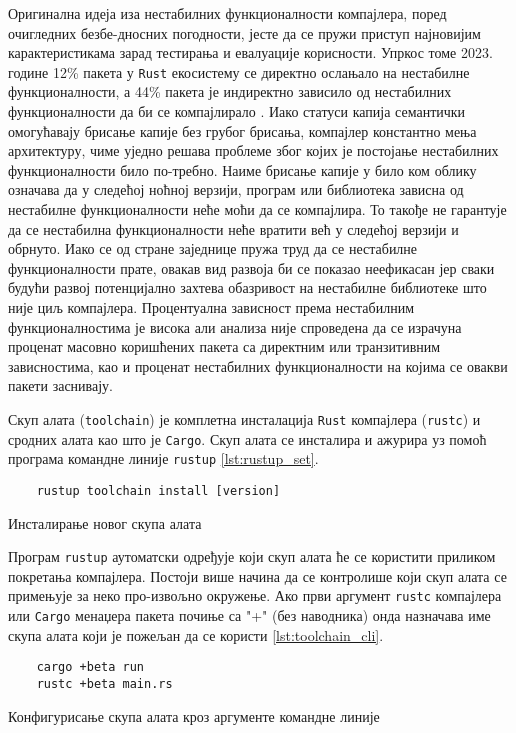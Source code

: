 Оригинална идеја иза нестабилних функционалности компајлера, поред очигледних безбе\hyp{}дносних погодности, 
јесте да се пружи приступ најновијим карактеристикама зарад тестирања и евалуације корисности.
Упркос томе 2023. године 12\%  пакета у \verb|Rust| екосистему се директно ослањало на нестабилне функционалности, а 
44\% пакета је индиректно зависило од нестабилних функционалности да би се компајлирало \cite{unstable-flags}. Иако 
статуси капија семантички омогућавају брисање капије без грубог брисања, компајлер константно мења архитектуру, чиме уједно 
решава проблеме због којих је постојање нестабилних функционалности било по\hyp{}требно. Наиме брисање капије 
у било ком облику означава да у следећој ноћној верзији, програм или библиотека зависна од нестабилне функционалности
неће моћи да се компајлира. То такође не гарантује да се нестабилна функционалности неће вратити већ у следећој
верзији и обрнуто. Иако се од стране заједнице пружа труд да се нестабилне функционалности прате, овакав вид 
развоја би се показао неефикасан јер сваки будући развој потенцијално захтева обазривост на нестабилне 
библиотеке што није циљ компајлера. Процентуална зависност према нестабилним функционалностима је висока али 
анализа није спроведена да се израчуна проценат масовно коришћених пакета са директним или транзитивним
зависностима, као и проценат нестабилних функционалности на којима се овакви пакети заснивају.

Скуп алата (\verb|toolchain|) је комплетна инсталација \verb|Rust| компајлера (\verb|rustc|) и сродних алата као што 
је \verb|Cargo|. Скуп алата се инсталира и ажурира уз помоћ програма командне линије \verb|rustup| \ref{lst:rustup_set}. 

\begin{listing}[H]
\begin{verbatim}
    rustup toolchain install [version]
\end{verbatim}
\caption{Инсталирање новог скупа алата}
\label{lst:rustup_set}
\end{listing}

Програм \verb|rustup| аутоматски одређује који скуп алата ће се користити приликом покретања компајлера. 
Постоји више начина да се контролише који скуп алата се примењује за неко про\hyp{}извољно окружење.
Ако први аргумент \verb|rustc| компајлера или \verb|Cargo| менаџера пакета почиње са "+" (без наводника) 
онда назначава име скупа алата који је пожељан да се користи \ref{lst:toolchain_cli}. 

\begin{listing}[H]
\begin{verbatim}
    cargo +beta run 
    rustc +beta main.rs
\end{verbatim}
\caption{Конфигурисање скупа алата кроз аргументе командне линије}
\label{lst:toolchain_cli}
\end{listing}

